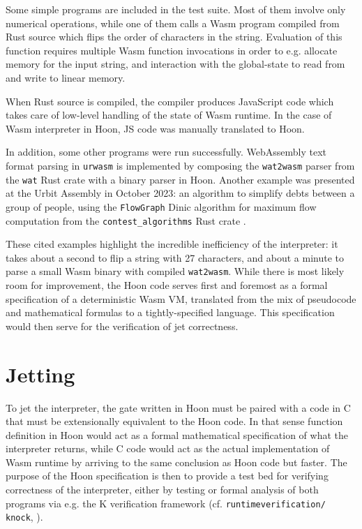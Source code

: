 \documentclass[twoside]{article}
\begin{document}
Some simple programs are included in the test suite. Most of them involve only numerical operations, while one of them calls a Wasm program compiled from Rust source which flips the order of characters in the string. Evaluation of this function requires multiple Wasm function invocations in order to e.g. allocate memory for the input string, and interaction with the global-state to read from and write to linear memory.

When Rust source is compiled, the compiler produces Java\-Script code which takes care of low-level handling of the state of Wasm runtime. In the case of Wasm interpreter in Hoon, JS code was manually translated to Hoon.

\sloppy
In addition, some other programs were run successfully. WebAssembly text format parsing in \texttt{urwasm} is implemented by composing the \texttt{wat2wasm} parser from the \texttt{wat} Rust crate with a binary parser in Hoon. Another example was presented at the Urbit Assembly in October 2023: an algorithm to simplify debts between a group of people, using the \texttt{FlowGraph} Dinic algorithm for maximum flow computation from the \lstinline[style=inlinecode]{contest_algorithms} Rust crate \citep{Afonin2023}.

These cited examples highlight the incredible inefficiency of the interpreter: it takes about a second to flip a string with 27 characters, and about a minute to parse a small Wasm binary with compiled \texttt{wat2wasm}. While there is most likely room for improvement, the Hoon code serves first and foremost as a formal specification of a deterministic Wasm VM, translated from the mix of pseudocode and mathematical formulas to a tightly-specified language. This specification would then serve for the verification of jet correctness.


\section{Jetting}

To jet the interpreter, the gate written in Hoon must be paired with a code in C that must be extensionally equivalent to the Hoon code. In that sense function definition in Hoon would act as a formal mathematical specification of what the interpreter returns, while C code would act as the actual implementation of Wasm runtime by arriving to the same conclusion as Hoon code but faster. The purpose of the Hoon specification is then to provide a test bed for verifying correctness of the interpreter, either by testing or formal analysis of both programs via e.g. the K verification framework (cf. \texttt{runtimeverification/ knock}, \citet{Hjort2023}).
\end{document}
